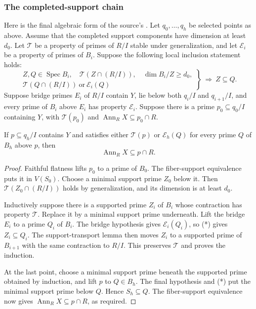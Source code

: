 \subsubsection{The completed-support chain}
Here is the final algebraic form of the source's .
Let $q_0,\ldots,q_h$ be selected points as above.
Assume that the completed support components have dimension at least
$d_0$. Let $\mathcal T$ be a property of primes of $R/I$ stable under
generalization, and let $\mathcal E_i$ be a property of primes of $B_i$.
Suppose the following local inclusion statement holds:
\[
 \left.
 \begin{array}{c}
 Z,Q\in\operatorname{Spec}B_i,\quad
 \mathcal T(Z\cap(R/I)),\quad\dim B_i/Z\ge d_0,\\
 \mathcal T(Q\cap(R/I))\ \text{or}\ \mathcal E_i(Q)
 \end{array}\right\}
                           \ \Longrightarrow\ Z\subseteq Q.       \tag{*}
\]
Suppose bridge primes $E_i$ of $R/I$ contain $Y$, lie below both
$q_i/I$ and $q_{i+1}/I$, and every prime of $B_i$ above $E_i$ has
property $\mathcal E_i$.
Suppose there is a prime $p_0\subseteq q_0/I$ containing $Y$, with
$\mathcal T(p_0)$ and
$\operatorname{Ann}_RX\subseteq p_0\cap R$.

\begin{srproposition}\label{prop:sr-completed-support-chain}
If $p\subseteq q_h/I$ contains $Y$ and satisfies either
$\mathcal T(p)$ or
$\mathcal E_h(Q)$ for every prime $Q$ of $B_h$ above $p$, then
\[
                            \operatorname{Ann}_RX\subseteq p\cap R.
\]
\end{srproposition}
\begin{proof}
Faithful flatness lifts $p_0$ to a prime of $B_0$.
The fiber-support equivalence puts it in $V(S_0)$.
Choose a minimal support prime $Z_0$ below it.
Then $\mathcal T(Z_0\cap(R/I))$ holds by generalization, and its
dimension is at least $d_0$.

Inductively suppose there is a supported prime $Z_i$ of $B_i$
whose contraction has property $\mathcal T$.
Replace it by a minimal support prime underneath.
Lift the bridge $E_i$ to a prime $Q_i$ of $B_i$.
The bridge hypothesis gives $\mathcal E_i(Q_i)$, so (*) gives
$Z_i\subseteq Q_i$.
The support-transport lemma then moves $Z_i$ to a supported prime
of $B_{i+1}$ with the same contraction to $R/I$.
This preserves $\mathcal T$ and proves the induction.

At the last point, choose a minimal support prime beneath the
supported prime obtained by induction, and lift $p$ to $Q\in B_h$.
The final hypothesis and (*) put the minimal support prime below $Q$.
Hence $S_h\subseteq Q$.
The fiber-support equivalence now gives
$\operatorname{Ann}_RX\subseteq p\cap R$, as required.
\end{proof}

